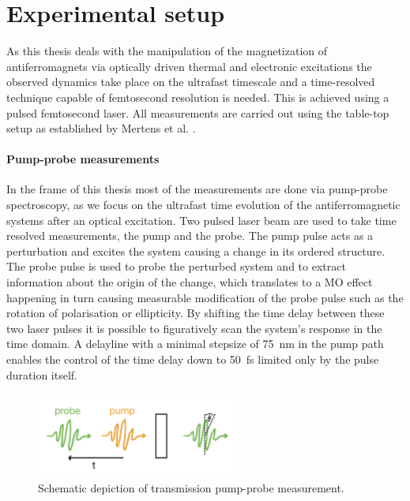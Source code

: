 \chapter{Experimental setup}
As this thesis deals with the manipulation of the magnetization of antiferromagnets via optically driven thermal and electronic excitations \cite{song_how_2018} the observed dynamics take place on the ultrafast timescale and a time-resolved technique capable of femtosecond resolution is needed.
This is achieved using a pulsed femtosecond laser.
All measurements are carried out using the table-top setup as established by Mertens et al. \cite{mertens_wide_2020}.

\subsubsection*{Pump-probe measurements}
In the frame of this thesis most of the measurements are done via pump-probe spectroscopy, as we focus on the ultrafast time evolution of the antiferromagnetic systems after an optical excitation.
Two pulsed laser beam are used to take time resolved measurements, the pump and the probe.
The pump pulse acts as a perturbation and excites the system causing a change in its ordered structure.
The probe pulse is used to probe the perturbed system and to extract information about the origin of the change, which translates to a MO effect happening in turn causing measurable modification of the probe pulse such as the rotation of polarisation or ellipticity.
By shifting the time delay between these two laser pulses it is possible to figuratively scan the system's response in the time domain.
A delayline with a minimal stepsize of \qty{75}{nm} in the pump path enables the control of the time delay down to \qty{50}{fs} limited only by the pulse duration itself.
\begin{figure}[ht]
    \centering
    \includegraphics[width=0.6\textwidth]{pictures/pump_probe.jpeg}
    \caption{Schematic depiction of transmission pump-probe measurement.}
    \label{fig:pump_probe}
\end{figure}

